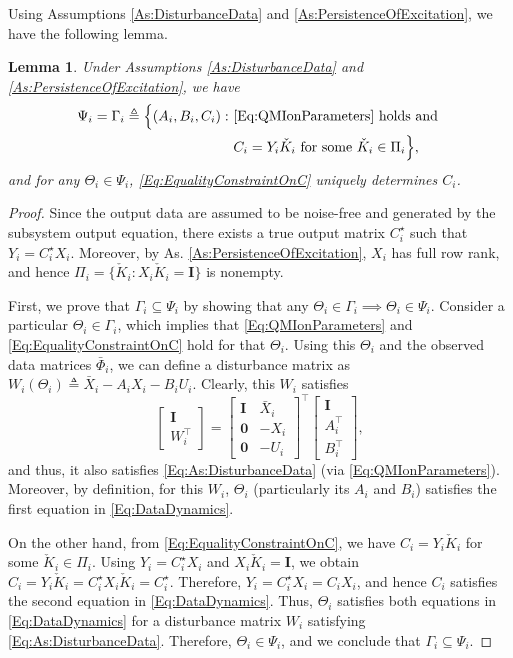 \documentclass[letterpaper, 10 pt, conference]{ieeeconf}%
\newcommand{\T}{\top}
\newcommand{\I}{\mathbf{I}}
\newcommand{\0}{\mathbf{0}}
\newcommand{\bm}[1]{\begin{bmatrix}#1\end{bmatrix}}
\newtheorem{lemma}{\textbf{Lemma}}
\begin{document}
Using Assumptions \ref{As:DisturbanceData} and \ref{As:PersistenceOfExcitation}, we have the following lemma. 

\begin{lemma}\label{Lm:Equivalence}
Under Assumptions \ref{As:DisturbanceData} and \ref{As:PersistenceOfExcitation}, we have 
$$
\begin{aligned}
\Psi_i = \Gamma_i \triangleq 
\Big\{(A_i,B_i,C_i):\ &\eqref{Eq:QMIonParameters} \mbox{ holds and } \\
&C_i=Y_i\check K_i \mbox{ for some } \check K_i\in\Pi_i
\Big\},  
\end{aligned}
$$
and for any $\Theta_i \in \Psi_i$, \eqref{Eq:EqualityConstraintOnC} uniquely determines $C_i$.
\end{lemma}
\begin{proof}
Since the output data are assumed to be noise-free and generated by the subsystem output equation, there exists a true output matrix $C_i^\star$ such that $Y_i=C_i^\star X_i$. Moreover, by As. \ref{As:PersistenceOfExcitation}, $X_i$ has full row rank, and hence $\Pi_i=\{\check K_i:X_i\check K_i=\I\}$ is nonempty.



First, we prove that $\Gamma_i \subseteq \Psi_i$ by showing that any $\Theta_i \in \Gamma_i \implies \Theta_i \in \Psi_i$. 
Consider a particular $\Theta_i \in \Gamma_i$, which implies that \eqref{Eq:QMIonParameters} and \eqref{Eq:EqualityConstraintOnC} hold for that $\Theta_i$. 
Using this $\Theta_i$ and the observed data matrices $\bar{\Phi}_i$, we can define a disturbance matrix as $W_i(\Theta_i) \triangleq \bar{X}_i - A_i X_i - B_i U_i$. 
Clearly, this $W_i$ satisfies 
$$\bm{\I \\ W_i^\T} = \bm{\I & \bar{X}_i \\ \0 & -X_i \\ \0 & -U_i}^\T \bm{\I \\ A_i^\T \\ B_i^\T},$$ and thus, it also satisfies \eqref{Eq:As:DisturbanceData} (via \eqref{Eq:QMIonParameters}). Moreover, by definition, for this $W_i$, $\Theta_i$ (particularly its $A_i$ and $B_i$) satisfies the first equation in \eqref{Eq:DataDynamics}. 

On the other hand, from \eqref{Eq:EqualityConstraintOnC}, we have $C_i=Y_i\check K_i$ for some $\check K_i\in\Pi_i$. Using $Y_i=C_i^\star X_i$ and $X_i\check K_i=\I$, we obtain
$
C_i=Y_i\check K_i=C_i^\star X_i\check K_i=C_i^\star.
$
Therefore, $Y_i=C_i^\star X_i=C_iX_i$, and hence $C_i$ satisfies the second equation in \eqref{Eq:DataDynamics}. Thus, $\Theta_i$ satisfies both equations in \eqref{Eq:DataDynamics} for a disturbance matrix $W_i$ satisfying \eqref{Eq:As:DisturbanceData}. Therefore, $\Theta_i\in\Psi_i$, and we conclude that $\Gamma_i\subseteq\Psi_i$. 


\end{proof}
\end{document}
